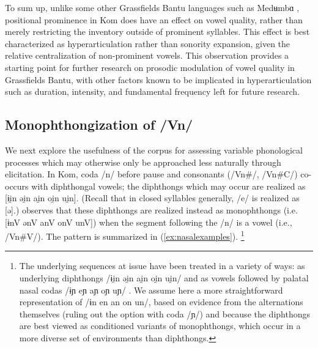\documentclass[output=paper,colorlinks,citecolor=brown
]{langscibook}
\begin{document}
To sum up, unlike some other Grassfields Bantu languages such as Medʉmbɑ \citep{franich2021metrical}, positional prominence in Kom does have an effect on vowel quality, rather than merely restricting the inventory outside of prominent syllables. 
This effect is best characterized as hyperarticulation rather than sonority expansion, given the relative centralization of non-prominent vowels. 
This observation provides a starting point for further research on prosodic modulation of vowel quality in Grassfields Bantu, with other factors known to be implicated in hyperarticulation such as duration, intensity, and fundamental frequency left for future research. 


\subsection{Monophthongization of /Vn/} \label{section:nasals}

We next explore the usefulness of the corpus for assessing variable phonological processes which may otherwise only be approached less naturally through elicitation. 
In Kom, coda /n/ before pause and consonants (/Vn\#/, /Vn\#C/) co-occurs with diphthongal vowels; the diphthongs which may occur are realized as [ɨi̯n əi̯n ai̯n oi̯n ui̯n]. (Recall that in closed syllables generally, /e/ is realized as [ə].)
\citet{njuasi2022monophthongization} observes that these diphthongs are realized instead as monophthongs (i.e. [ɨn\*V ən\*V an\*V on\*V un\*V]) when the segment following the /n/ is a vowel (i.e., /Vn\#V/). The pattern is summarized in (\ref{ex:nasalexamples}).
\footnote{The underlying sequences at issue have been treated in a variety of ways: as underlying diphthongs /ɨi̯n əi̯n ai̯n oi̯n ui̯n/ \citep{njuasi2022monophthongization} and as vowels followed by palatal nasal codas /ɨɲ eɲ aɲ oɲ uɲ/ \citep{shultz-1993,shultz1997kom}. We assume here a more straightforward representation of /ɨn en an on un/, based on evidence from the alternations themselves (ruling out the option with coda /ɲ/) 
and because the diphthongs are best viewed as conditioned variants of monophthongs, which occur in a more diverse set of environments than diphthongs.}  

\end{document}
